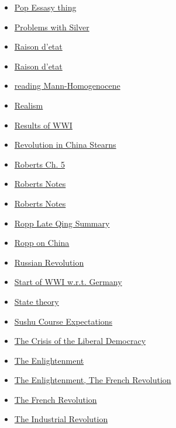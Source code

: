 \documentclass[11pt]{article}
\begin{document}
\begin{itemize}
\begin{itemize}
\begin{itemize}
\item \href{history/history10/KBxPopExibhit.org}{Pop Essasy thing}
\item \href{history/history10/KBhHIST201ProblemsWithSilver.org}{Problems with Silver}
\item \href{history/history10/KBhHIST201RaisonDeEtat.org}{Raison d'etat}
\item \href{history/history10/KBrefRaisondetat.org}{Raison d'etat}
\item \href{history/history10/KB20200826092400.org}{reading Mann-Homogenocene}
\item \href{history/history10/KBhHIST201Realism.org}{Realism}
\item \href{history/history10/KBhHIST201WWIResults.org}{Results of WWI}
\item \href{history/history10/KBe21hist201floRevolutionInChina.org}{Revolution in China Stearns}
\item \href{history/history10/KBhHIST201RobertsCh5.org}{Roberts Ch. 5}
\item \href{history/history10/KBRobertsNotes.org}{Roberts Notes}
\item \href{history/history10/KBOnRoberts.org}{Roberts Notes}
\item \href{history/history10/KBe20hist201retRoppLateQingSummary.org}{Ropp Late Qing Summary}
\item \href{history/history10/KBxRoppChina.org}{Ropp on China}
\item \href{history/history10/KBhHIST201RussianRevolution.org}{Russian Revolution}
\item \href{history/history10/KBhHIST201WWIStartWRTGermany.org}{Start of WWI w.r.t. Germany}
\item \href{history/history10/KB20200827104601.org}{State theory}
\item \href{history/history10/KBhHIST201SushuCourseExpectation.org}{Sushu Course Expectations}
\item \href{history/history10/KBhHIST201CrisisOfLibDemo.org}{The Crisis of the Liberal Democracy}
\item \href{history/history10/KBhHIST201TheEnlightenment.org}{The Enlightenment}
\item \href{history/history10/KBhHIST201EnlightenmentFrenchRev.org}{The Enlightenment, The French Revolution}
\item \href{history/history10/KBhHIST201FrenchRevolution.org}{The French Revolution}
\item \href{history/history10/KBhHIST201IndustrialRevolution.org}{The Industrial Revolution}

\end{itemize}
\end{itemize}
\end{itemize}
\end{document}
